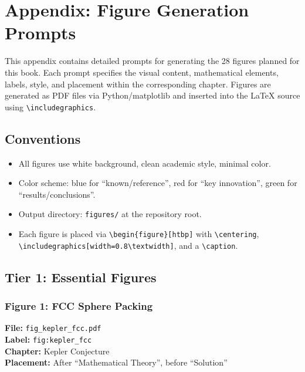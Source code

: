 \chapter*{Appendix: Figure Generation Prompts}

This appendix contains detailed prompts for generating the 28 figures planned for this book. Each prompt specifies the visual content, mathematical elements, labels, style, and placement within the corresponding chapter. Figures are generated as PDF files via Python/matplotlib and inserted into the \LaTeX{} source using \verb|\includegraphics|.

\section*{Conventions}
\begin{itemize}
\item All figures use white background, clean academic style, minimal color.
\item Color scheme: blue for ``known/reference'', red for ``key innovation'', green for ``results/conclusions''.
\item Output directory: \texttt{figures/} at the repository root.
\item Each figure is placed via \verb|\begin{figure}[htbp]| with \verb|\centering|, \verb|\includegraphics[width=0.8\textwidth]|, and a \verb|\caption|.
\end{itemize}


\section*{Tier 1: Essential Figures}

\subsection*{Figure 1: FCC Sphere Packing}
\textbf{File:} \texttt{fig\_kepler\_fcc.pdf} \\
\textbf{Label:} \texttt{fig:kepler\_fcc} \\
\textbf{Chapter:} Kepler Conjecture \\
\textbf{Placement:} After ``Mathematical Theory'', before ``Solution''


